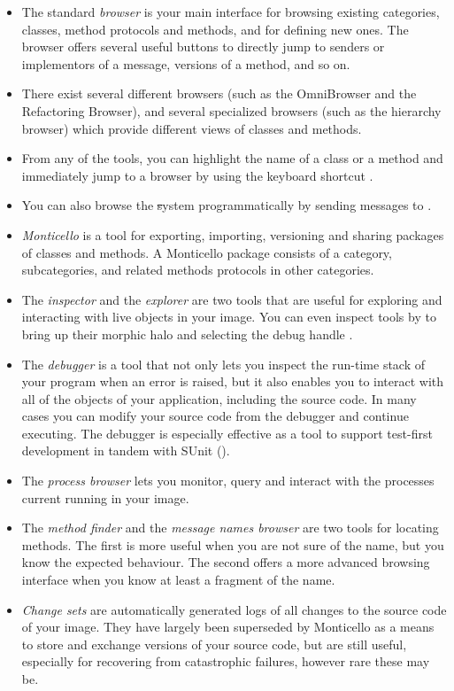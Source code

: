 \documentclass[a4paper,10pt,twoside]{book}
\begin{document}
\begin{itemize}
  \item The standard \emph{browser} is your main interface for browsing existing categories, classes, method protocols and methods, and for defining new ones.
  The browser offers several useful buttons to directly jump to senders or implementors of a message, versions of a method, and so on.
  \item There exist several different browsers (such as the OmniBrowser and the Refactoring Browser), and several specialized browsers (such as the hierarchy browser) which provide different views of classes and methods.
  \item From any of the tools, you can highlight the name of a class or a method and immediately jump to a browser by using the keyboard shortcut .
  \item You can also browse the \st system programmatically by sending messages to .
  \item \emph{Monticello} is a tool for exporting, importing, versioning and sharing packages of classes and methods.
  A Monticello package consists of a category, subcategories, and related methods protocols in other categories.
  \item The \emph{inspector} and the \emph{explorer} are two tools that are useful for exploring and interacting with live objects in your image.
  You can even inspect tools by  to bring up their morphic halo and selecting the debug handle \debugHandle.
  \item The \emph{debugger} is a tool that not only lets you inspect the run-time stack of your program when an error is raised, but it also enables you to interact with all of the objects of your application, including the source code. In many cases you can modify your source code from the debugger and continue executing. The debugger is especially effective as a tool to support test-first development in tandem with SUnit ().
  \item The \emph{process browser} lets you monitor, query and interact with the processes current running in your image.
  \item The \emph{method finder} and the \emph{message names browser} are two tools for locating methods. The first is more useful when you are not sure of the name, but you know the expected behaviour. The second offers a more advanced browsing interface when you know at least a fragment of the name.
  \item \emph{Change sets} are automatically generated logs of all changes to the source code of your image. They have largely been superseded by Monticello as a means to store and exchange versions of your source code, but are still useful, especially for recovering from catastrophic failures, however rare these may be.

\end{itemize}
\end{document}
